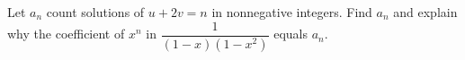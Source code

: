 Let $a_n$ count solutions of $u+2v=n$ in nonnegative integers. Find $a_n$ and explain why the coefficient of $x^n$ in $\dfrac{1}{(1-x)(1-x^2)}$ equals $a_n$.
